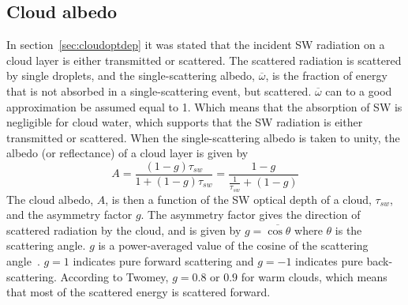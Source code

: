 \subsection{Cloud albedo}
In section~\ref{sec:cloudoptdep} it was stated that the incident SW radiation on a cloud layer is either transmitted or scattered. The scattered radiation is scattered by single droplets, and the single-scattering albedo, $\overline{\omega}$, is the fraction of energy that is not absorbed in a single-scattering event, but scattered. $\overline{\omega}$ can to a good approximation be assumed equal to 1. Which means that the absorption of SW is negligible for cloud water, which supports that the SW radiation is either transmitted or scattered. When the single-scattering albedo is taken to unity, the albedo (or reflectance) of a cloud layer is given by~\citep{Hobbs1993}%
\begin{equation}
A = \frac{(1-g)\tau_{sw}}{1+(1-g)\tau_{sw}} = \frac{1-g}{\frac{1}{\tau_{sw}}+(1-g)}
\label{eqn:cloudalbedo_theory}
\end{equation}
The cloud albedo, $A$, is then a function of the SW optical depth of a cloud, $\tau_{sw}$, and the asymmetry factor $g$. The asymmetry factor gives the direction of scattered radiation by the cloud, and is given by $g=\overline{\cos \theta}$ where $\theta$ is the scattering angle. $g$ is a power-averaged value of the cosine of the scattering angle~\citep{Twomey1974}. $g=1$ indicates pure forward scattering and $g=-1$ indicates pure back-scattering. According to Twomey, $g=0.8$ or $0.9$ for warm clouds, which means that most of the scattered energy is scattered forward.




